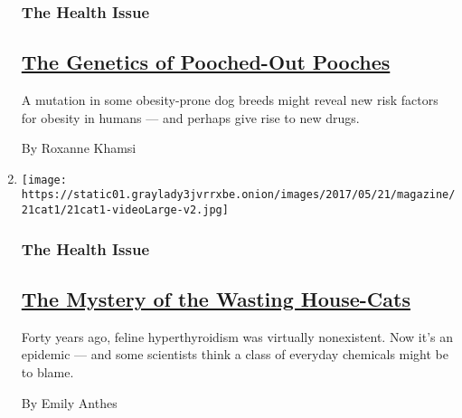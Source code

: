 \begin{enumerate}
  \hypertarget{the-health-issue-2}{%
  \subsubsection{The Health Issue}\label{the-health-issue-2}}

  \hypertarget{the-genetics-of-pooched-out-pooches}{%
  \subsection{\texorpdfstring{\href{/2017/05/16/magazine/the-genetics-of-pooched-out-pooches.html}{The
  Genetics of Pooched-Out
  Pooches}}{The Genetics of Pooched-Out Pooches}}\label{the-genetics-of-pooched-out-pooches}}

  A mutation in some obesity-prone dog breeds might reveal new risk
  factors for obesity in humans --- and perhaps give rise to new drugs.

  By Roxanne Khamsi
\item
  \texttt{[image: https://static01.graylady3jvrrxbe.onion/images/2017/05/21/magazine/21cat1/21cat1-videoLarge-v2.jpg]}

  \hypertarget{the-health-issue-3}{%
  \subsubsection{The Health Issue}\label{the-health-issue-3}}

  \hypertarget{the-mystery-of-the-wasting-house-cats}{%
  \subsection{\texorpdfstring{\href{/2017/05/16/magazine/the-mystery-of-the-wasting-house-cats.html}{The
  Mystery of the Wasting
  House-Cats}}{The Mystery of the Wasting House-Cats}}\label{the-mystery-of-the-wasting-house-cats}}

  Forty years ago, feline hyperthyroidism was virtually nonexistent. Now
  it's an epidemic --- and some scientists think a class of everyday
  chemicals might be to blame.

  By Emily Anthes
\end{enumerate}


